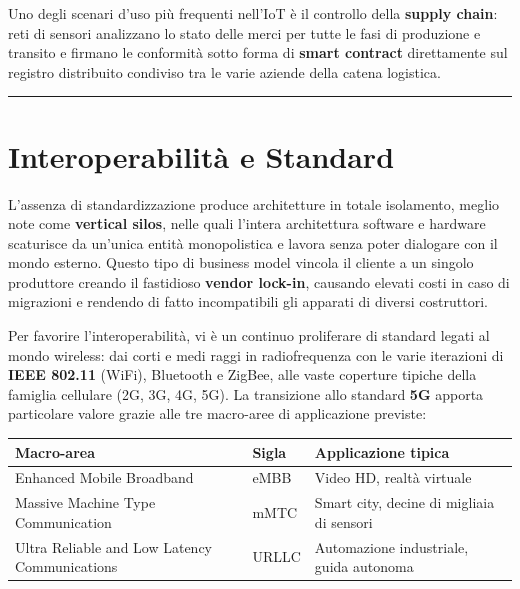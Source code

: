 \documentclass[
  italian,
  openany]{book}
\newcounter{none} %
\begin{document}
Uno degli scenari d'uso più frequenti nell'IoT è il controllo della
\textbf{supply chain}: reti di sensori analizzano lo stato delle merci
per tutte le fasi di produzione e transito e firmano le conformità sotto
forma di \textbf{smart contract} direttamente sul registro distribuito
condiviso tra le varie aziende della catena logistica.

\begin{center}\rule{0.5\linewidth}{0.5pt}\end{center}

\section{Interoperabilità e
Standard}\label{interoperabilituxe0-e-standard}

L'assenza di standardizzazione produce architetture in totale
isolamento, meglio note come \textbf{vertical silos}, nelle quali
l'intera architettura software e hardware scaturisce da un'unica entità
monopolistica e lavora senza poter dialogare con il mondo esterno.
Questo tipo di business model vincola il cliente a un singolo produttore
creando il fastidioso \textbf{vendor lock-in}, causando elevati costi in
caso di migrazioni e rendendo di fatto incompatibili gli apparati di
diversi costruttori.

Per favorire l'interoperabilità, vi è un continuo proliferare di
standard legati al mondo wireless: dai corti e medi raggi in
radiofrequenza con le varie iterazioni di \textbf{IEEE 802.11} (WiFi),
Bluetooth e ZigBee, alle vaste coperture tipiche della famiglia
cellulare (2G, 3G, 4G, 5G). La transizione allo standard \textbf{5G}
apporta particolare valore grazie alle tre macro-aree di applicazione
previste:

{\def\LTcaptype{none} %
\begin{longtable}[]{@{}
  >{\raggedright\arraybackslash}p{}
  >{\raggedright\arraybackslash}p{}
  >{\raggedright\arraybackslash}p{}@{}}
\toprule\noalign{}
\begin{minipage}[b]{\linewidth}\raggedright
Macro-area
\end{minipage} & \begin{minipage}[b]{\linewidth}\raggedright
Sigla
\end{minipage} & \begin{minipage}[b]{\linewidth}\raggedright
Applicazione tipica
\end{minipage} \\
\midrule\noalign{}
\endhead
\bottomrule\noalign{}
\endlastfoot
Enhanced Mobile Broadband & eMBB & Video HD, realtà virtuale \\
Massive Machine Type Communication & mMTC & Smart city, decine di
migliaia di sensori \\
Ultra Reliable and Low Latency Communications & URLLC & Automazione
industriale, guida autonoma \\
\end{longtable}
}
\end{document}
